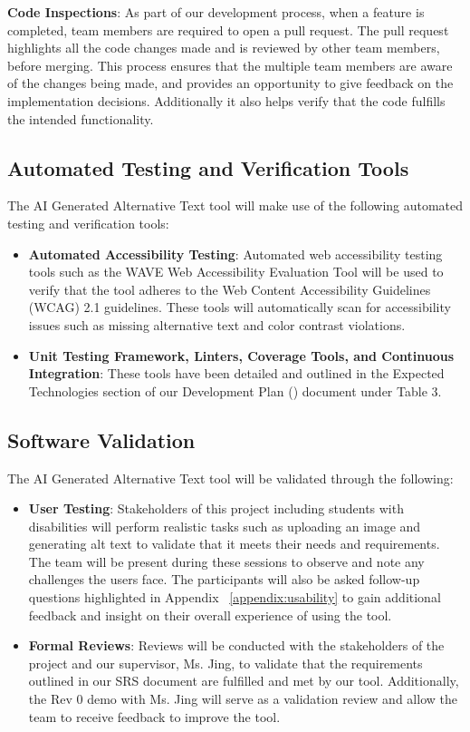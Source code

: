 \documentclass[12pt, titlepage]{article}
\begin{document}
\textbf{Code Inspections}:
As part of our development process, when a feature is completed, team members are required to open a pull request. The pull request highlights all the code changes made and is reviewed by other team members, before merging. 
This process ensures that the multiple team members are aware of the changes being made, and provides an opportunity to give feedback on 
the implementation decisions. Additionally it also helps verify that the code fulfills the intended functionality.

\subsection{Automated Testing and Verification Tools}
The AI Generated Alternative Text tool will make use of the following automated testing and verification tools: 
\begin{itemize}
  \item \textbf{Automated Accessibility Testing}: Automated web accessibility testing tools such as the WAVE Web Accessibility Evaluation Tool will be used to 
  verify that the tool adheres to the Web Content Accessibility Guidelines (WCAG) 2.1 guidelines. These tools will automatically scan for accessibility issues such as missing alternative text and color contrast violations.
  \item \textbf{Unit Testing Framework, Linters, Coverage Tools, and Continuous Integration}: These tools have been detailed and outlined in the Expected Technologies section
  of our Development Plan (\citet{DP}) document under Table 3. 
\end{itemize}

\subsection{Software Validation}
The AI Generated Alternative Text tool will be validated through the following: 
\begin{itemize}
  \item \textbf{User Testing}: Stakeholders of this project including students with disabilities
  will perform realistic tasks such as uploading an image and generating alt text to validate 
  that it meets their needs and requirements. The team will be present during these sessions to observe and note any challenges 
  the users face. The participants will also be asked follow-up questions highlighted in Appendix ~\ref{appendix:usability} to gain additional feedback and insight
  on their overall experience of using the tool. 
  \item \textbf{Formal Reviews}: Reviews will be conducted with the stakeholders of the project and our supervisor, Ms. Jing, to validate that the requirements
  outlined in our SRS document are fulfilled and met by our tool. Additionally, the Rev 0 demo with Ms. Jing will serve as a validation review and allow the team 
  to receive feedback to improve the tool. 
\end{itemize} 
\end{document}
